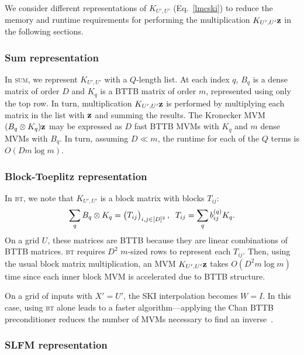 \documentclass[twoside]{article}
\begin{document}
We consider different representations of $K_{{U'},{U'}}$ (Eq.~\ref{lmcski}) to reduce the memory and runtime requirements for performing the multiplication $K_{{U'},{U'}}\textbf{z}$ in the following sections.

\subsubsection{Sum representation}
 
In \textsc{sum}, we represent $K_{{U'},{U'}}$ with a $Q$-length list. At each index $q$, $B_q$ is a dense matrix of order $D$ and $K_q$ is a BTTB matrix of order $m$, represented using only the top row. In turn, multiplication $K_{{U'},{U'}}\textbf{z}$ is performed by multiplying each matrix in the list with $\textbf{z}$ and summing the results. The Kronecker MVM $(B_q\otimes K_q)\textbf{z}$ may be expressed as $D$ fast BTTB MVMs with $K_q$ and $m$ dense MVMs with $B_q$. In turn, assuming $D\ll m$, the runtime for each of the $Q$ terms is $O(Dm\log m)$.

\subsubsection{Block-Toeplitz representation}

In \textsc{bt}, we note that $K_{{U'},{U'}}$ is a block matrix with blocks $T_{ij}$:
\begin{align*}
\sum_qB_q\otimes K_q =\begin{pmatrix} T_{ij} \end{pmatrix}_{i,j\in[D]^2},\;\; T_{ij}=\sum_qb_{ij}^{(q)}K_q.
\end{align*}
On a grid $U$, these matrices are BTTB because they are linear combinations of BTTB matrices. \textsc{bt} requires $D^2$ $m$-sized rows to represent each $T_{ij}$. Then, using the usual block matrix multiplication, an MVM $K_{{U'},{U'}}\textbf{z}$ takes $O(D^2m\log m)$ time since each inner block MVM is accelerated due to BTTB structure.

On a grid of inputs with ${X'}={U'}$, the SKI interpolation becomes $W=I$. In this case, using \textsc{bt} alone leads to a faster algorithm---applying the Chan BTTB preconditioner reduces the number of MVMs necessary to find an inverse~\citep{chan1994circulant}.

\subsubsection{SLFM representation}
\end{document}
